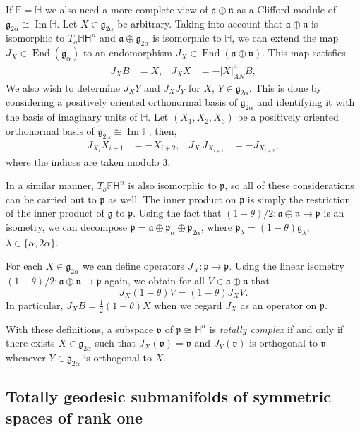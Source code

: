 \documentclass[12pt, a4paper]{amsart}
\newcommand{\g}{\mathfrak}
\newcommand{\s}{\mathsf}
\renewcommand{\H}{\mathbb{H}}
\newcommand{\F}{\mathbb{F}}
\newcommand{\End}{\operatorname{End}}
\theoremstyle{definition}
\begin{document}
If $\F=\H$ we also need a more complete view of $\g{a}\oplus\g{n}$ as a Clifford module
of $\g{g}_{2\alpha}\cong \operatorname{Im}\H$.
Let $X\in\g{g}_{2\alpha}$ be arbitrary.
Taking into account that $\g{a}\oplus\g{n}$ is isomorphic to $T_o\H\s{H}^n$
and $\g{a}\oplus\g{g}_{2\alpha}$ is isomorphic to $\H$,
we can extend the map $J_X\in\End(\g{g}_{\alpha})$ to an endomorphism
$J_X\in\End(\g{a}\oplus\g{n})$.
This map satisfies
\begin{align*}
J_X B&{}=X, 
&J_X X&{}=-\lvert X\rvert_{AN}^2B,
\end{align*}
We also wish to determine $J_X Y$ and $J_X J_Y$ for $X$, $Y\in\g{g}_{2\alpha}$.
This is done by considering a positively oriented orthonormal basis of $\g{g}_{2\alpha}$ and identifying it with the basis of imaginary units of $\mathbb{H}$.
Let $(X_1,X_2,X_3)$ be a positively oriented orthonormal basis of $\g{g}_{2\alpha}\cong\operatorname{Im}\H$; then,
\begin{align*}
J_{X_i}X_{i+1}&{}=-X_{i+2},
&J_{X_i}J_{X_{i+1}}&{}=-J_{X_{i+2}},
\end{align*}
where the indices are taken modulo 3.

In a similar manner, $T_o\mathbb{F}\s{H}^n$ is also isomorphic to $\g{p}$, so all of these considerations can be carried out to $\g{p}$ as well.
The inner product on $\g{p}$ is simply the restriction of the inner product of $\g{g}$ to $\g{p}$.
Using the fact that $(1-\theta)/2\colon\g{a}\oplus\g{n}\to\g{p}$ is an isometry, 
we can decompose $\g{p}=\g{a}\oplus\g{p}_\alpha\oplus\g{p}_{2\alpha}$,
where $\g{p}_\lambda=(1-\theta)\g{g}_\lambda$, $\lambda\in\{\alpha,2\alpha\}$.

For each $X\in\g{g}_{2\alpha}$ we can define operators $J_X\colon\g{p}\to\g{p}$. 
Using the linear isometry $(1-\theta)/2\colon\g{a}\oplus\g{n}\to\g{p}$ again, 
we obtain for all $V\in\g{a}\oplus\g{n}$ that
\[
J_X(1-\theta)V=(1-\theta)J_X V.
\]
In particular, $J_X B=\frac{1}{2}(1-\theta)X$ when we regard $J_X$ as an
operator on $\g{p}$.

With these definitions, a subspace $\g{v}$ of $\g{p}\cong\H^n$ is \emph{totally complex} 
if and only if there exists $X\in\g{g}_{2\alpha}$ such that $J_X(\g{v})=\g{v}$
and $J_Y(\g{v})$ is orthogonal to $\g{v}$ whenever $Y\in\g{g}_{2\alpha}$ is orthogonal to $X$.


\subsection{Totally geodesic submanifolds of symmetric spaces of rank one}\label{sec:fhn-tg-submanifolds}\hfill
\end{document}
